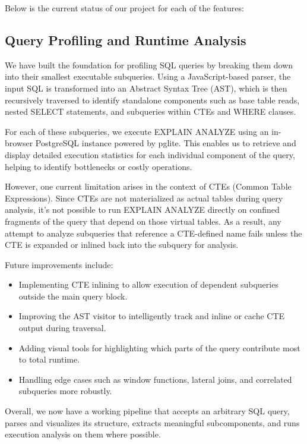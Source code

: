 \documentclass{article}
\begin{document}
Below is the current status of our project for each of the features:

\subsection{Query Profiling and Runtime Analysis}

We have built the foundation for profiling SQL queries by breaking them down into their smallest executable subqueries. Using a JavaScript-based parser, the input SQL is transformed into an Abstract Syntax Tree (AST), which is then recursively traversed to identify standalone components such as base table reads, nested SELECT statements, and subqueries within CTEs and WHERE clauses.

For each of these subqueries, we execute EXPLAIN ANALYZE using an in-browser PostgreSQL instance powered by pglite. This enables us to retrieve and display detailed execution statistics for each individual component of the query, helping to identify bottlenecks or costly operations.

However, one current limitation arises in the context of CTEs (Common Table Expressions). Since CTEs are not materialized as actual tables during query analysis, it's not possible to run EXPLAIN ANALYZE directly on confined fragments of the query that depend on those virtual tables. As a result, any attempt to analyze subqueries that reference a CTE-defined name fails unless the CTE is expanded or inlined back into the subquery for analysis.

Future improvements include: \begin{itemize} \item Implementing CTE inlining to allow execution of dependent subqueries outside the main query block. \item Improving the AST visitor to intelligently track and inline or cache CTE output during traversal. \item Adding visual tools for highlighting which parts of the query contribute most to total runtime. \item Handling edge cases such as window functions, lateral joins, and correlated subqueries more robustly. \end{itemize}

Overall, we now have a working pipeline that accepts an arbitrary SQL query, parses and visualizes its structure, extracts meaningful subcomponents, and runs execution analysis on them where possible.
\end{document}
